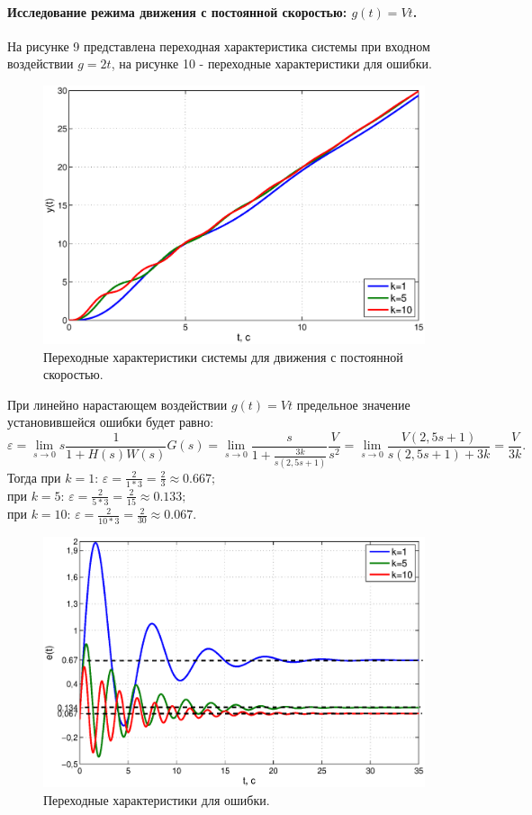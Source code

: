 \documentclass[12pt,a4paper]{article}
\begin{document}
\paragraph*{Исследование режима движения с постоянной скоростью: $g(t)=Vt$.} 
На рисунке 9 представлена переходная характеристика системы при входном воздействии $g=2t$, на рисунке 10  - переходные характеристики для ошибки.
\begin{figure}[H]
	\centering
	\includegraphics[width=1\linewidth]{2.2.1.eps}
	\caption{Переходные характеристики системы для движения с постоянной скоростью.}
\end{figure}
При линейно нарастающем воздействии $g(t)=Vt$ предельное значение установившейся ошибки будет равно:
\begin{equation}
    \varepsilon = \lim_{s\to 0}s\frac{1}{1+H(s)W(s)}G(s) = \lim_{s\to 0}\frac{s}{1 + \displaystyle{\frac{3k}{s(2,5s+1)}}}\frac{V}{s^2} = \lim_{s\to0} \frac{V(2,5s+1)}{s(2,5s+1)+3k}= \frac{V}{3k}.
\end{equation}
Тогда при $k=1$: $\varepsilon = \displaystyle{\frac{2}{1*3} = \frac{2}{3} \approx  0.667;}$\\
при $k=5$: $\varepsilon = \displaystyle{\frac{2}{5*3} = \frac{2}{15} \approx  0.133;}$\\
при $k=10$: $\varepsilon = \displaystyle{\frac{2}{10*3} = \frac{2}{30} \approx  0.067.}$
\begin{figure}[H]
	\centering
	\includegraphics[width=0.95\linewidth]{2.2.2.eps}
	\caption{Переходные характеристики для ошибки.}
\end{figure}
\end{document}

